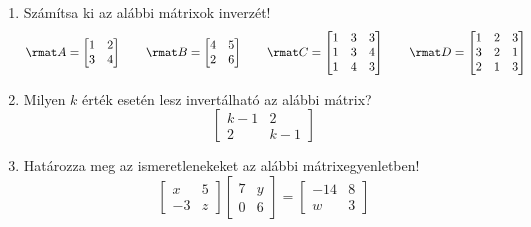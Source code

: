 \documentclass[a4paper, 12pt]{scrartcl}
\begin{document}
\begin{enumerate}
  \item Számítsa ki az alábbi mátrixok inverzét!
        $$
          \rmat A =
          \begin{bmatrix}
            1 & 2 \\
            3 & 4
          \end{bmatrix}
          \qquad
          \rmat B =
          \begin{bmatrix}
            4 & 5 \\
            2 & 6
          \end{bmatrix}
          \qquad
          \rmat C =
          \begin{bmatrix}
            1 & 3 & 3 \\
            1 & 3 & 4 \\
            1 & 4 & 3
          \end{bmatrix}
          \qquad
          \rmat D =
          \begin{bmatrix}
            1 & 2 & 3 \\
            3 & 2 & 1 \\
            2 & 1 & 3
          \end{bmatrix}
        $$

  \item Milyen $k$ érték esetén lesz invertálható az alábbi mátrix?
        $$
          \begin{bmatrix}
            k-1 & 2   \\
            2   & k-1
          \end{bmatrix}
        $$

  \item Határozza meg az ismeretlenekeket az alábbi mátrixegyenletben!
        $$
          \begin{bmatrix}
            x  & 5 \\
            -3 & z
          \end{bmatrix}
          \begin{bmatrix}
            7 & y \\
            0 & 6
          \end{bmatrix}
          =
          \begin{bmatrix}
            -14 & 8 \\
            w   & 3
          \end{bmatrix}
        $$


\end{enumerate}
\end{document}
